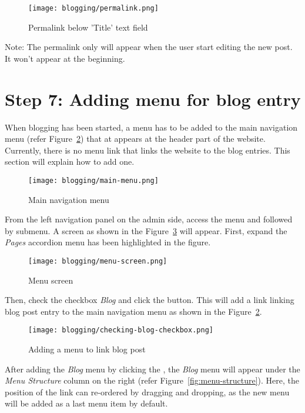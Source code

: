 \begin{figure}[ht]
\caption{Permalink below 'Title' text field}
\label{fig:permalink-blog-post}
\centering
\texttt{[image: blogging/permalink.png]}
\end{figure}

Note: The permalink only will appear when the user start editing the new post. It won't appear at the beginning.

\section*{Step 7: Adding menu for blog entry}
When blogging has been started, a menu has to be added to the main navigation menu (refer Figure~\ref{fig:main-menu}) that at appears at the header part of the website. Currently, there is no menu link that links the website to the blog entries. This section will explain how to add one.

\begin{figure}[ht]
\caption{Main navigation menu}
\label{fig:main-menu}
\centering
\texttt{[image: blogging/main-menu.png]}
\end{figure}

From the left navigation panel on the admin side, access the  menu and followed by   submenu. A screen as shown in the Figure~\ref{fig:menu-screen} will appear. First, expand the \emph{Pages} accordion menu has been highlighted in the figure.

\begin{figure}[ht]
\caption{Menu screen}
\label{fig:menu-screen}
\centering
\texttt{[image: blogging/menu-screen.png]}
\end{figure}

Then, check the checkbox \emph{Blog} and click the  button. This will add a link linking blog post entry to the main navigation menu as shown in the Figure~\ref{fig:main-menu}.

\begin{figure}[ht]
\caption{Adding a menu to link blog post}
\label{fig:checking-blog-checkbox}
\centering
\texttt{[image: blogging/checking-blog-checkbox.png]}
\end{figure}

After adding the \emph{Blog} menu by clicking the , the \emph{Blog} menu will appear under the \emph{Menu Structure} column on the right (refer Figure~\ref{fig:menu-structure}). Here, the position of the link can re-ordered by dragging and dropping, as the new menu will be added as a last menu item by default.

